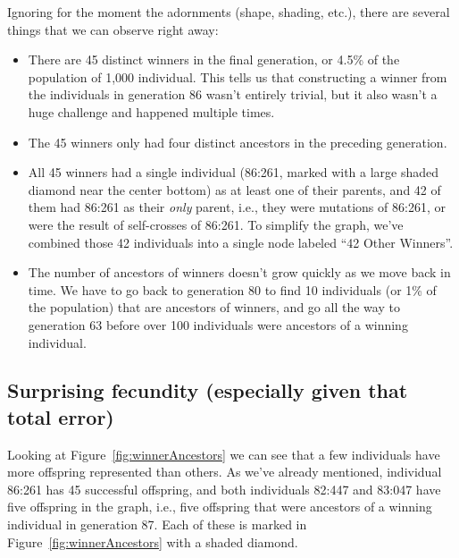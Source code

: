 Ignoring for the moment the adornments (shape, shading, etc.), there are several things that
we can observe right away:
\begin{itemize}
	\item There are 45 distinct winners in the final generation, or 4.5\% of the population of
	1,000 individual. This tells us that constructing a winner from the individuals in generation 86
	wasn't entirely trivial, but it also wasn't a huge challenge and happened multiple times.
	\item The 45 winners only had four distinct ancestors in the preceding generation.
	\item All 45 winners had a single individual (86:261, marked with a large shaded diamond near
	the center bottom) as at least one of their parents, and 42 of
	them had 86:261 as their \emph{only} parent, i.e., they were mutations of 86:261, or were the result
	of self-crosses of 86:261. To simplify the graph, we've combined those 42 individuals into a
	single node labeled ``42 Other Winners''.
	\item The number of ancestors of winners doesn't grow quickly as we move back in time. We have to
	go back to generation 80 to find 10 individuals (or 1\% of the population) that are ancestors of
	winners, and go all the way to generation 63 before over 100 individuals were ancestors of a winning individual.
\end{itemize}

\subsection{Surprising fecundity (especially given that total error)}
\label{sec:surprisingFecundity}

Looking at Figure~\ref{fig:winnerAncestors} we can see that a few individuals have more offspring
represented than others. As we've already mentioned, individual 86:261 has 45 successful offspring,
and both individuals 82:447 and 83:047 have five offspring in the graph, i.e., five offspring that were
ancestors of a winning individual in generation 87. Each of these is marked in 
Figure~\ref{fig:winnerAncestors} with a shaded diamond.

